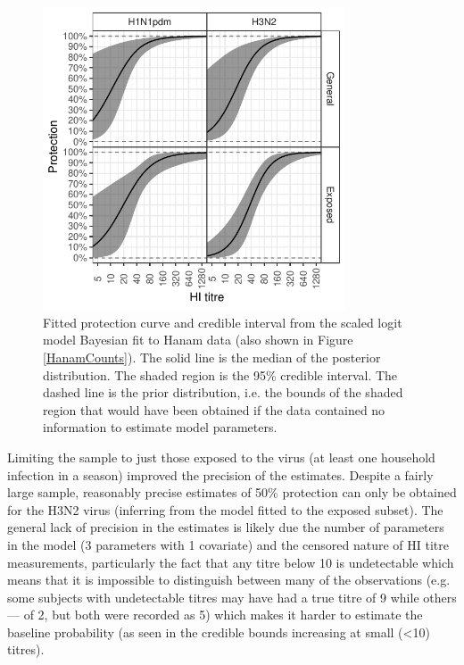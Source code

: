 \documentclass[12pt]{article}
\begin{document}
\begin{figure}[htp]
	\centering
	\includegraphics[width=0.8\textwidth]{../fit-bayesian-plot/protection_light.pdf}
	\caption{
	Fitted protection curve and credible interval from the scaled logit model Bayesian fit to Hanam data (also shown in Figure \ref{HanamCounts}). The solid line is the median of the posterior distribution. The shaded region is the 95\% credible interval. The dashed line is the prior distribution, i.e. the bounds of the shaded region that would have been obtained if the data contained no information to estimate model parameters.
	}
	\label{SclrBayesProt}
\end{figure}

Limiting the sample to just those exposed to the virus (at least one household infection in a season) improved the precision of the estimates. Despite a fairly large sample, reasonably precise estimates of 50\% protection can only be obtained for the H3N2 virus (inferring from the model fitted to the exposed subset). The general lack of precision in the estimates is likely due the number of parameters in the model (3 parameters with 1 covariate) and the censored nature of HI titre measurements, particularly the fact that any titre below 10 is undetectable which means that it is impossible to distinguish between many of the observations (e.g. some subjects with undetectable titres may have had a true titre of 9 while others --- of 2, but both were recorded as 5) which makes it harder to estimate the baseline probability (as seen in the credible bounds increasing at small (<10) titres).
\end{document}
